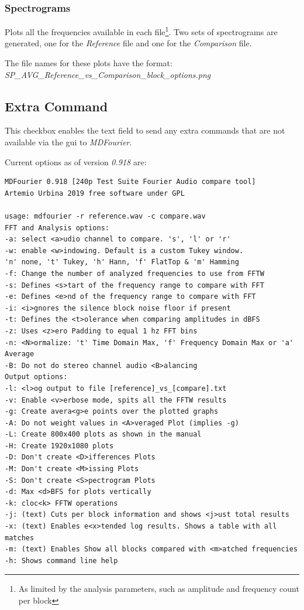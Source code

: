 \documentclass[10pt,a4paper]{report}
\begin{document}
\begin{appendices}
\subsubsection{Spectrograms}

Plots all the frequencies available in each file\footnote{As limited by the analysis parameters, such as amplitude and frequency count per block}. Two sets of spectrograms are generated, one for the \textit{Reference} file and one for the \textit{Comparison} file.

The file names for these plots have the format:\\ \textit{SP\_AVG\_Reference\_vs\_Comparison\_block\_options.png}

\subsection{Extra Command}
\label{extracommand}

This checkbox enables the text field to send any extra commands that are not available via the \acrshort{gui} to \textit{MDFourier}. 

Current options as of version \textit{0.918} are:

\begin{verbatim}
MDFourier 0.918 [240p Test Suite Fourier Audio compare tool]
Artemio Urbina 2019 free software under GPL

usage: mdfourier -r reference.wav -c compare.wav
FFT and Analysis options:
-a: select <a>udio channel to compare. 's', 'l' or 'r'
-w: enable <w>indowing. Default is a custom Tukey window.
'n' none, 't' Tukey, 'h' Hann, 'f' FlatTop & 'm' Hamming
-f: Change the number of analyzed frequencies to use from FFTW
-s: Defines <s>tart of the frequency range to compare with FFT
-e: Defines <e>nd of the frequency range to compare with FFT
-i: <i>gnores the silence block noise floor if present
-t: Defines the <t>olerance when comparing amplitudes in dBFS
-z: Uses <z>ero Padding to equal 1 hz FFT bins
-n: <N>ormalize: 't' Time Domain Max, 'f' Frequency Domain Max or 'a' Average
-B: Do not do stereo channel audio <B>alancing
Output options:
-l: <l>og output to file [reference]_vs_[compare].txt
-v: Enable <v>erbose mode, spits all the FFTW results
-g: Create avera<g>e points over the plotted graphs
-A: Do not weight values in <A>veraged Plot (implies -g)
-L: Create 800x400 plots as shown in the manual
-H: Create 1920x1080 plots
-D: Don't create <D>ifferences Plots
-M: Don't create <M>issing Plots
-S: Don't create <S>pectrogram Plots
-d: Max <d>BFS for plots vertically
-k: cloc<k> FFTW operations
-j: (text) Cuts per block information and shows <j>ust total results
-x: (text) Enables e<x>tended log results. Shows a table with all matches
-m: (text) Enables Show all blocks compared with <m>atched frequencies
-h: Shows command line help
\end{verbatim}


\end{appendices}
\end{document}
